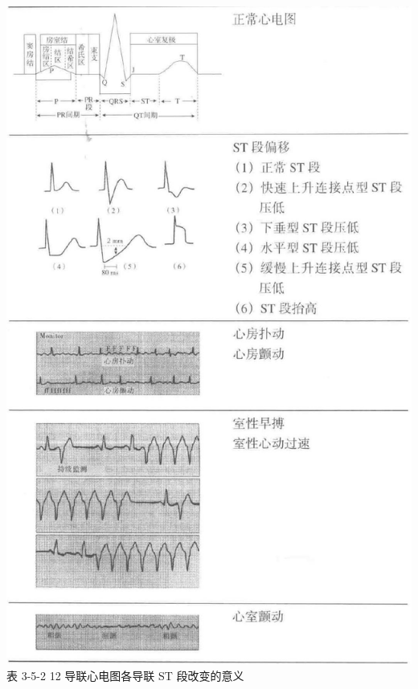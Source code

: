 \documentclass[10pt]{article}
\begin{document}
\includegraphics[max width=\textwidth, center]{2024_07_05_645bb794a4d4f32ee0c8g-096}\\
表 3-5-2 12 导联心电图各导联 ST 段改变的意义
\end{document}
